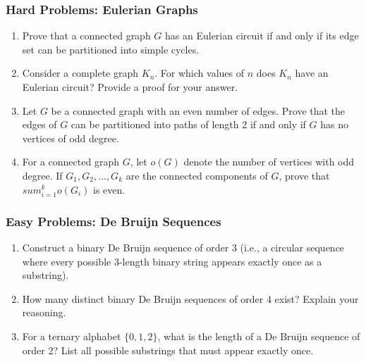 \documentclass{article}
\theoremstyle{definition}
\def\sum{sum}%
\begin{document}
\subsubsection{Hard Problems: Eulerian Graphs}
\begin{enumerate}[resume]
    \item Prove that a connected graph $G$ has an Eulerian circuit if and only if its edge set can be partitioned into simple cycles.
    
    \item Consider a complete graph $K_n$. For which values of $n$ does $K_n$ have an Eulerian circuit? Provide a proof for your answer.
    
    \item Let $G$ be a connected graph with an even number of edges. Prove that the edges of $G$ can be partitioned into paths of length 2 if and only if $G$ has no vertices of odd degree.
    
    \item For a connected graph $G$, let $o(G)$ denote the number of vertices with odd degree. If $G_1, G_2, \ldots, G_k$ are the connected components of $G$, prove that $\sum_{i=1}^{k} o(G_i)$ is even.
\end{enumerate}

\subsubsection{Easy Problems: De Bruijn Sequences}
\begin{enumerate}[resume]
    \item Construct a binary De Bruijn sequence of order 3 (i.e., a circular sequence where every possible 3-length binary string appears exactly once as a substring).
    
    \item How many distinct binary De Bruijn sequences of order 4 exist? Explain your reasoning.
    
    \item For a ternary alphabet $\{0,1,2\}$, what is the length of a De Bruijn sequence of order 2? List all possible substrings that must appear exactly once.
    
    
\end{enumerate}
\end{document}
